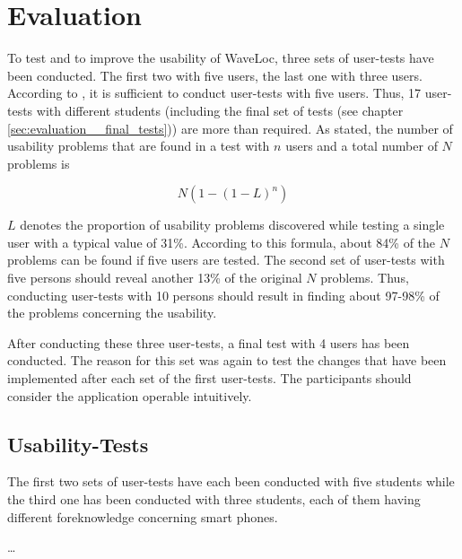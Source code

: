 \chapter{Evaluation}
\label{cha:evaluation}

To  test and to improve the usability of WaveLoc, three sets of user-tests have been conducted. The first two with five users, the last one with three users. According to \citet{ruleof5}, it is sufficient to conduct user-tests with five users. Thus, 17 user-tests with different students (including the final set of tests (see chapter \ref{sec:evaluation__final_tests})) are more than required. As stated, the number of usability problems that are found in a test with $n$ users and a total number of $N$ problems is

$$N(1-(1-L)^n)$$

$L$  denotes the proportion of usability problems discovered while testing a single user with a typical value of 31\%. According to this formula, about 84\% of the $N$ problems can be found if five users are tested. The second set of user-tests with five persons should reveal another 13\% of the original $N$ problems. Thus, conducting user-tests with 10 persons should result in finding about 97-98\% of the problems concerning the usability.

After conducting these three user-tests, a final test with 4 users has been conducted. The reason for this set was again to test the changes that have been implemented after each set of the first user-tests. The participants should consider the application operable intuitively.


\section{Usability-Tests}
\label{sec:evaluation__usability_tests}

The first two sets of user-tests have each been conducted with five students while the third one has been conducted with three students, each of them having different foreknowledge concerning smart phones.

\ldots{}